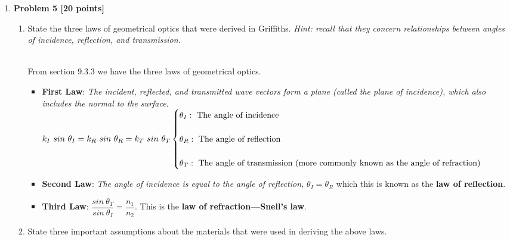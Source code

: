 \documentclass[fleqn]{article}
\begin{document}
\begin{enumerate}
\begin{enumerate}
      \end{enumerate}

    \item \textbf{Problem 5 [20 points]}
    \begin{enumerate}
      \item State the three laws of geometrical optics that were derived in Griffiths. \emph{Hint: recall that they
      concern relationships between angles of incidence, reflection, and transmission.}

        \textcolor{hwColor}{
          \\
          From section $9.3.3$ we have the three laws of geometrical optics.
          \\
          \begin{itemize}
            \item \textbf{First Law}: \emph{The incident, reflected, and transmitted wave vectors
            form a plane (called the plane of incidence), which also includes the
            normal to the surface}. 
            \\
            $
              k_I ~ sin ~ \theta_I=k_R ~ sin ~ \theta_R=k_T ~ sin ~ \theta_T
              \\
              \\
              \begin{cases}
                \theta_I: ~ \text{The angle of incidence}
                \\
                \\
                \theta_R: ~ \text{The angle of reflection} 
                \\
                \\
                \theta_T: ~ \text{The angle of transmission (more commonly known as the angle of refraction)} 
              \end{cases}
            $
            \\
            \item \textbf{Second Law}: \emph{The angle of incidence is equal to the angle of
            reflection,} $\theta_I=\theta_R$ which this is known as the \textbf{law of reflection}.
            \item \textbf{Third Law}: $\dfrac{sin ~ \theta_T}{sin ~ \theta_I}=\dfrac{n_1}{n_2}$. This is the \textbf{law of refraction—Snell’s law}.
          \end{itemize}
        }


      \item State three important assumptions about the materials that were used in deriving the above laws.


\end{enumerate}
\end{enumerate}
\end{document}
